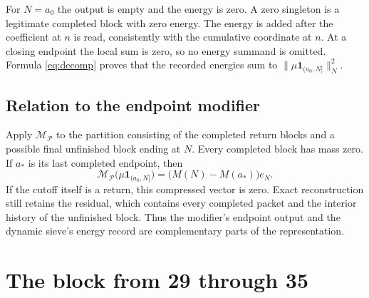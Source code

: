 \documentclass[11pt]{article}
\theoremstyle{definition}
\theoremstyle{remark}
\begin{document}
For $N=a_0$ the output is empty and the energy is zero. A zero singleton is a legitimate completed block with zero energy. The energy is added after the coefficient at $n$ is read, consistently with the cumulative coordinate at $n$. At a closing endpoint the local sum is zero, so no energy summand is omitted. Formula \eqref{eq:decomp} proves that the recorded energies sum to $\|\mu\mathbf 1_{(a_0,N]}\|_N^2$.

\subsection{Relation to the endpoint modifier}

Apply $\mathcal M_{\mathcal P}$ to the partition consisting of the completed return blocks and a possible final unfinished block ending at $N$. Every completed block has mass zero. If $a_*$ is its last completed endpoint, then
\begin{equation}
\mathcal M_{\mathcal P}\big(\mu\mathbf 1_{(a_0,N]}\big)=\big(M(N)-M(a_*)\big)e_N.
\end{equation}
If the cutoff itself is a return, this compressed vector is zero. Exact reconstruction still retains the residual, which contains every completed packet and the interior history of the unfinished block. Thus the modifier's endpoint output and the dynamic sieve's energy record are complementary parts of the representation.

\section{The block from 29 through 35}\label{sec:example}
\end{document}
